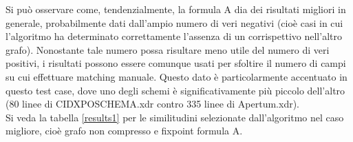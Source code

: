 \documentclass[a4paper,10pt]{article}
\begin{document}
\begin{center}
\end{center}

Si può osservare come, tendenzialmente, la formula A dia dei risultati migliori in generale, probabilmente dati dall'ampio numero di veri negativi (cioè casi in cui l'algoritmo ha determinato correttamente l'assenza di un corrispettivo nell'altro grafo). Nonostante tale numero possa risultare meno utile del numero di veri positivi, i risultati possono essere comunque usati per sfoltire il numero di campi su cui effettuare matching manuale. Questo dato è particolarmente accentuato in questo test case, dove uno degli schemi è significativamente più piccolo dell'altro (80 linee di CIDXPOSCHEMA.xdr contro 335 linee di Apertum.xdr).\\

Si veda la tabella \ref{results1} per le similitudini selezionate dall’algoritmo nel caso migliore, cioè grafo non compresso e fixpoint formula A.
\end{document}
